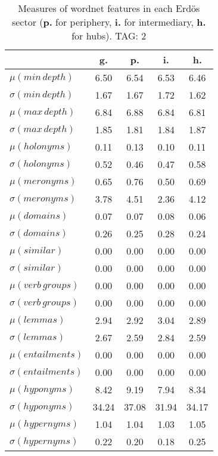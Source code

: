 \begin{table}[h!]
\begin{center}
\begin{tabular}{| l | c | c | c | c |}\hline
 & g. & p. & i. & h. \\\hline
$\mu(min\,depth)$ & 6.50  & 6.54  & 6.53  & 6.46 \\\hline
$\sigma(min\,depth)$ & 1.67  & 1.67  & 1.72  & 1.62 \\\hline
$\mu(max\,depth)$ & 6.84  & 6.88  & 6.84  & 6.81 \\\hline
$\sigma(max\,depth)$ & 1.85  & 1.81  & 1.84  & 1.87 \\\hline
$\mu(holonyms)$ & 0.11  & 0.13  & 0.10  & 0.11 \\\hline
$\sigma(holonyms)$ & 0.52  & 0.46  & 0.47  & 0.58 \\\hline
$\mu(meronyms)$ & 0.65  & 0.76  & 0.50  & 0.69 \\\hline
$\sigma(meronyms)$ & 3.78  & 4.51  & 2.36  & 4.12 \\\hline
$\mu(domains)$ & 0.07  & 0.07  & 0.08  & 0.06 \\\hline
$\sigma(domains)$ & 0.26  & 0.25  & 0.28  & 0.24 \\\hline
$\mu(similar)$ & 0.00  & 0.00  & 0.00  & 0.00 \\\hline
$\sigma(similar)$ & 0.00  & 0.00  & 0.00  & 0.00 \\\hline
$\mu(verb\,groups)$ & 0.00  & 0.00  & 0.00  & 0.00 \\\hline
$\sigma(verb\,groups)$ & 0.00  & 0.00  & 0.00  & 0.00 \\\hline
$\mu(lemmas)$ & 2.94  & 2.92  & 3.04  & 2.89 \\\hline
$\sigma(lemmas)$ & 2.67  & 2.59  & 2.84  & 2.59 \\\hline
$\mu(entailments)$ & 0.00  & 0.00  & 0.00  & 0.00 \\\hline
$\sigma(entailments)$ & 0.00  & 0.00  & 0.00  & 0.00 \\\hline
$\mu(hyponyms)$ & 8.42  & 9.19  & 7.94  & 8.34 \\\hline
$\sigma(hyponyms)$ & 34.24  & 37.08  & 31.94  & 34.17 \\\hline
$\mu(hypernyms)$ & 1.04  & 1.04  & 1.03  & 1.05 \\\hline
$\sigma(hypernyms)$ & 0.22  & 0.20  & 0.18  & 0.25 \\\hline
\end{tabular}
\caption{Measures of wordnet features in each Erd\"os sector ({{\bf p.}} for periphery, {{\bf i.}} for intermediary, {{\bf h.}} for hubs). TAG: 2}
\end{center}
\end{table}